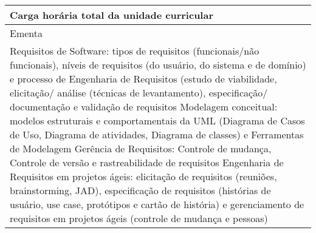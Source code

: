 \begin{quadro}[ht!]
\begin{tabular}{|p{3cm} p{2cm} p{3cm} p{2cm} p{3cm} p{2cm}|}
\multicolumn{5}{|p{13cm}|}{\cellcolor{blue1} Carga horária total da unidade curricular} & \multicolumn{1}{p{1cm}|}{\raggedleft 60	}\\\hline
\multicolumn{6}{|p{15cm}|}{\cellcolor{blue1} Ementa} \\\hline
\hline\multicolumn{6}{|p{15cm}|}{\scriptsize Requisitos de Software: tipos de requisitos (funcionais/não funcionais), níveis de requisitos (do usuário, do sistema e de domínio) e processo de Engenharia de Requisitos (estudo de viabilidade, elicitação/ análise (técnicas de levantamento), especificação/ documentação e validação de requisitos Modelagem conceitual: modelos estruturais e comportamentais da UML (Diagrama de Casos de Uso, Diagrama de atividades, Diagrama de classes) e Ferramentas de Modelagem Gerência de Requisitos: Controle de mudança, Controle de versão e rastreabilidade de requisitos Engenharia de Requisitos em projetos ágeis: elicitação de requisitos (reuniões, brainstorming, JAD), especificação de requisitos (histórias de usuário, use case, protótipos e cartão de história) e gerenciamento de requisitos em projetos ágeis (controle de mudança e pessoas)}\\\hline
\hline
	\end{tabular}
\end{quadro}
